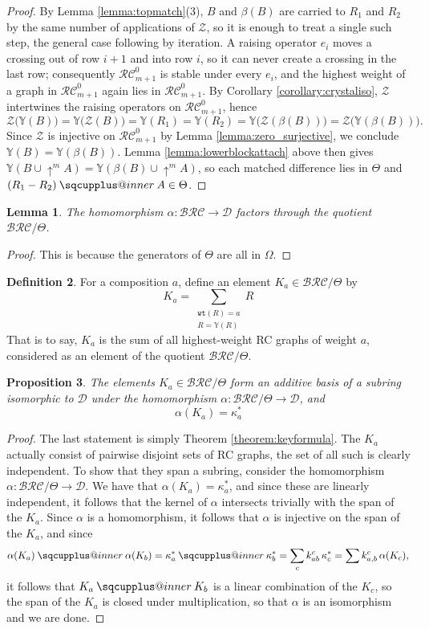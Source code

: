\documentclass{amsart}
\makeatletter
\newcommand{\sqcupplus@inner}[2]{%
  \vcenter{\hbox{\ooalign{%
    \hfil$\m@th#1\sqcup$\hfil\cr
    \hfil\raisebox{0.15ex}{$\m@th#1\scriptscriptstyle+$}\hfil\cr
  }}}%
}
\newcommand{\sqcupplus}{\mathbin{\mathpalette\sqcupplus@inner\relax}}
\newtheorem{lemma}{Lemma}[subsection]
\newtheorem{proposition}[lemma]{Proposition}
\theoremstyle{definition}
\newtheorem{definition}[lemma]{Definition}
\theoremstyle{remark}
\numberwithin{equation}{subsection}
\newcommand{\shup}{{\uparrow}}
\newcommand{\wtt}{\mathtt{wt}}
\newcommand{\zeromap}{\mathcal{Z}}
\newcommand{\BRC}{\mathcal{BRC}}
\newcommand{\RC}{\mathcal{RC}}
\newcommand{\dcoma}{\mathcal{D}}
\makeatother
\begin{document}
\begin{proof}
  By Lemma \ref{lemma:topmatch}(3), $B$ and $\beta(B)$ are carried to $R_1$ and $R_2$ by the same number of applications of $\zeromap$, so it is enough to treat a single such step, the general case following by iteration. A raising operator $e_i$ moves a crossing out of row $i+1$ and into row $i$, so it can never create a crossing in the last row; consequently $\RC_{m+1}^0$ is stable under every $e_i$, and the highest weight of a graph in $\RC_{m+1}^0$ again lies in $\RC_{m+1}^0$. By Corollary \ref{corollary:crystaliso}, $\zeromap$ intertwines the raising operators on $\RC_{m+1}^0$, hence
  $$\zeromap\bigl(\mathbb{Y}(B)\bigr)=\mathbb{Y}\bigl(\zeromap(B)\bigr)=\mathbb{Y}(R_1)=\mathbb{Y}(R_2)=\mathbb{Y}\bigl(\zeromap(\beta(B))\bigr)=\zeromap\bigl(\mathbb{Y}(\beta(B))\bigr).$$
  Since $\zeromap$ is injective on $\RC_{m+1}^0$ by Lemma \ref{lemma:zero_surjective}, we conclude $\mathbb{Y}(B)=\mathbb{Y}(\beta(B))$. Lemma \ref{lemma:lowerblockattach} above then gives $\mathbb{Y}(B\cup\shup^{m}A)=\mathbb{Y}(\beta(B)\cup\shup^{m}A)$, so each matched difference lies in $\Theta$ and $(R_1-R_2)\sqcupplus A\in\Theta$.
\end{proof}


\begin{lemma}
  The homomorphism $\alpha:\BRC\to\dcoma$ factors through the quotient $\BRC/\Theta$.
\end{lemma}
\begin{proof}
This is because the generators of $\Theta$ are all in $\Omega$.
\end{proof}

\begin{definition}
For a composition $a$, define  an element $K_a\in\BRC/\Theta$ by
$$K_a =\sum_{\substack{\wtt(R)=a\\ R=\mathbb{Y}(R)}} R$$
That is to say, $K_a$ is the sum of all highest-weight RC graphs of weight $a$, considered as an element of the quotient $\BRC/\Theta$.
\end{definition}

\begin{proposition}
The elements $K_a\in\BRC/\Theta$ form an additive basis of a subring isomorphic to $\dcoma$ under the homomorphism $\alpha:\BRC/\Theta\to \dcoma$, and 
$$\alpha(K_a) = \kappa_a^*$$
\end{proposition}
\begin{proof}
The last statement is simply Theorem \ref{theorem:keyformula}. The $K_a$ actually consist of pairwise disjoint sets of RC graphs, the set of all such is clearly independent. To show that they span a subring, consider the homomorphism $\alpha:\BRC/\Theta\to \dcoma$. We have that $\alpha(K_a)=\kappa_a^*$, and since these are linearly independent, it follows that the kernel of $\alpha$ intersects trivially with the span of the $K_a$. Since $\alpha$ is a homomorphism, it follows that $\alpha$ is injective on the span of the $K_a$, and since 
$$\alpha(K_a)\sqcupplus\alpha(K_b) = \kappa_a^*\sqcupplus\kappa_b^*=\sum_{c}k_{ab}^c\,\kappa_c^*=\sum k_{a,b}^c\,\alpha(K_c),$$ 
it follows that $K_a\sqcupplus K_b$ is a linear combination of the $K_c$, so the span of the $K_a$ is closed under multiplication, so that $\alpha$ is an isomorphism and we are done.
\end{proof}
\end{document}
